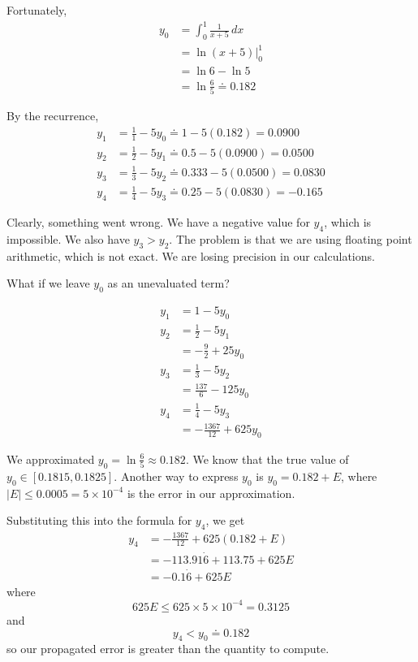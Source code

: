 \begin{example}
    Fortunately, \begin{align*}
        y_0
         & = \int_0^1 \frac{1}{x + 5} \,dx \\
         & = \ln (x + 5) \Big|_0^1         \\
         & = \ln 6 - \ln 5                 \\
         & = \ln \frac{6}{5}
        \doteq 0.182
    \end{align*}

    By the recurrence, \begin{align*}
        y_1 & = \frac{1}{1} - 5 y_0 \doteq 1 - 5 (0.182) = 0.0900      \\
        y_2 & = \frac{1}{2} - 5 y_1 \doteq 0.5 - 5 (0.0900) = 0.0500   \\
        y_3 & = \frac{1}{3} - 5 y_2 \doteq 0.333 - 5 (0.0500) = 0.0830 \\
        y_4 & = \frac{1}{4} - 5 y_3 \doteq 0.25 - 5 (0.0830) = -0.165
    \end{align*}

    Clearly, something went wrong. We have a negative value for \( y_4 \), which is impossible. We also have \( y_3 > y_2 \). The problem is that we are using floating point arithmetic, which is not exact. We are losing precision in our calculations.

    What if we leave \( y_0 \) as an unevaluated term?

    \begin{align*}
        y_1 & = 1 - 5y_0                  \\
        y_2 & = \frac{1}{2} - 5y_1        \\
            & = -\frac{9}{2} + 25y_0      \\
        y_3 & = \frac{1}{3} - 5y_2        \\
            & = \frac{137}{6} - 125y_0    \\
        y_4 & = \frac{1}{4} - 5y_3        \\
            & = -\frac{1367}{12} + 625y_0
    \end{align*}

    We approximated \( y_0 = \ln \frac{6}{5} \approx 0.182 \). We know that the true value of \( y_0 \in [0.1815, 0.1825] \). Another way to express \( y_0 \) is \( y_0 = 0.182 + E \), where \( | E | \leq 0.0005 = 5 \times 10^{-4} \) is the error in our approximation.

    Substituting this into the formula for \( y_4 \), we get \begin{align*}
        y_4 & = -\frac{1367}{12} + 625(0.182 + E) \\
            & = -113.91\dot{6} + 113.75 + 625E    \\
            & = -0.1\dot{6} + 625E
    \end{align*}
    where \[
        625 E \leq 625 \times 5 \times 10^{-4} = 0.3125
    \] and \[
        y_4 < y_0 \doteq 0.182
    \] so our propagated error is greater than the quantity to compute.
\end{example}

